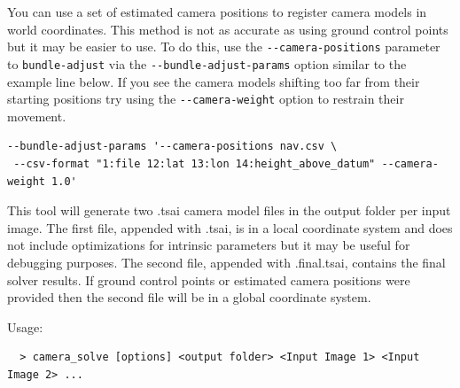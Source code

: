 You can use a set of estimated camera positions to register
camera models in world coordinates.
This method is not as accurate as using ground control points but it may
be easier to use.  To do this, use the \texttt{-\/-camera-positions} parameter to
\texttt{bundle-adjust} via the \texttt{-\/-bundle-adjust-params} option similar to
the example line below.  If you see the camera models shifting too far from their
starting positions try using the \texttt{-\/-camera-weight} option to restrain
their movement.

\begin{verbatim}
--bundle-adjust-params '--camera-positions nav.csv \
 --csv-format "1:file 12:lat 13:lon 14:height_above_datum" --camera-weight 1.0'
\end{verbatim}

This tool will generate two .tsai camera model files in the output folder per input image.
The first file, appended with .tsai, is in a local coordinate system and does not include
optimizations for intrinsic parameters but it may be useful for debugging purposes.
The second file, appended with .final.tsai, contains the final solver results.  If ground control points or
estimated camera positions were provided then the second file will be in a global coordinate system.


Usage:
\begin{verbatim}
  > camera_solve [options] <output folder> <Input Image 1> <Input Image 2> ...
\end{verbatim}

